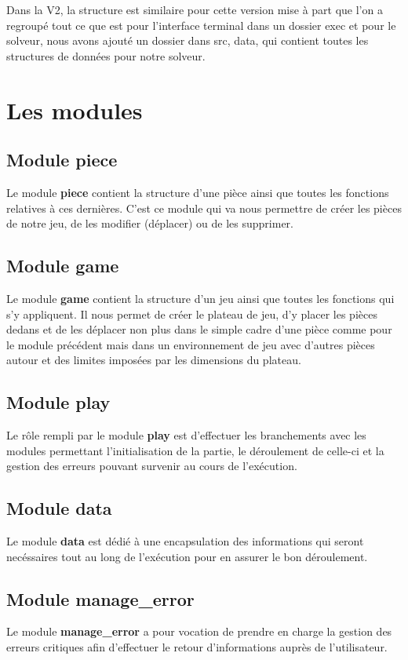 \documentclass{report}
\begin{document}
Dans la V2, la structure est similaire pour cette version mise à part que l'on a regroupé tout ce que est pour l'interface terminal dans un dossier exec et pour le solveur, nous avons ajouté un dossier dans src, data, qui contient toutes les structures de données pour notre solveur.

\section{Les modules}
\subsection*{Module piece}
Le module \textbf{piece} contient la structure d'une pièce ainsi que toutes les fonctions relatives à ces dernières. C'est ce module qui va nous permettre de créer les pièces de notre jeu, de les modifier (déplacer) ou de les supprimer.
\subsection*{Module game}
Le module \textbf{game} contient la structure d'un jeu ainsi que toutes les fonctions qui s'y appliquent. Il nous permet de créer le plateau de jeu, d'y placer les pièces dedans et de les déplacer non plus dans le simple cadre d'une pièce comme pour le module précédent mais dans un environnement de jeu avec d'autres pièces autour et des limites imposées par les dimensions du plateau.
\subsection*{Module play}
Le rôle rempli par le module \textbf{play} est d'effectuer les branchements avec les modules permettant l'initialisation de la partie, le déroulement de celle-ci et la gestion des erreurs pouvant survenir au cours de l'exécution.
\subsection*{Module data}
Le module \textbf{data} est dédié à une encapsulation des informations qui seront necéssaires tout au long de l'exécution pour en assurer le bon déroulement.
\subsection*{Module manage\_error}
Le module \textbf{manage\_error} a pour vocation de prendre en charge la gestion des erreurs critiques afin d'effectuer le retour d'informations auprès de l'utilisateur.
\end{document}
